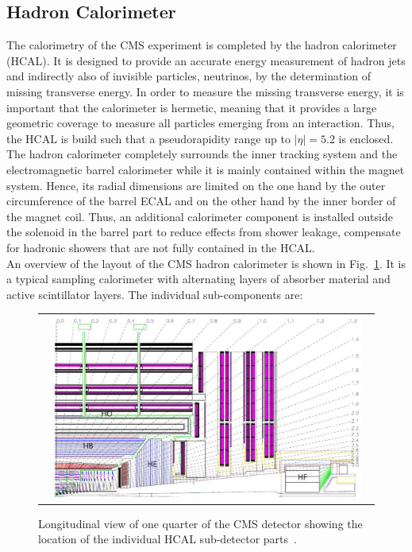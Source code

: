 \subsection{Hadron Calorimeter}
\label{subsec:cms_hcal}
The calorimetry of the CMS experiment is completed by the hadron calorimeter (HCAL). It is designed to provide an accurate energy measurement of hadron jets and indirectly also of invisible particles, \eg neutrinos, by the determination of missing transverse energy. In order to measure the missing transverse energy, it is important that the calorimeter is hermetic, meaning that it provides a large geometric coverage to measure all particles emerging from an interaction. Thus, the HCAL is build such that a pseudorapidity range up to $|\eta| = 5.2$ is enclosed. \\ 
The hadron calorimeter completely surrounds the inner tracking system and the electromagnetic barrel calorimeter while it is mainly contained within the magnet system. Hence, its radial dimensions are limited on the one hand by the outer circumference of the barrel ECAL and on the other hand by the inner border of the magnet coil. Thus, an additional calorimeter component is installed outside the solenoid in the barrel part to reduce effects from shower leakage, \ie compensate for hadronic showers that are not fully contained in the HCAL. \\
An overview of the layout of the CMS hadron calorimeter is shown in Fig.~\ref{fig:CMS_hcal}. It is a typical sampling calorimeter with alternating layers of absorber material and active scintillator layers. The individual sub-components are:
\begin{figure}[!tp]
  \centering
  \begin{tabular}{c}
    \includegraphics[width=0.95\textwidth]{figures/Figures_Experimental_Apparatus_HCAL.png}
  \end{tabular}
  \caption{Longitudinal view of one quarter of the CMS detector showing the location of the individual HCAL sub-detector parts~\cite{Chatrchyan:2008zzk}.}
  \label{fig:CMS_hcal}
\end{figure}
